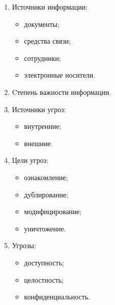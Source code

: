 \begin{minipage}{0.45\textwidth}
  \begin{enumerate}
    \item Источники информации:
      \begin{itemize}
    	\item документы;
    	\item средства связи;
    	\item сотрудники;
    	\item электронные носители.
      \end{itemize}
    \item Cтепень важности информации.
    \item Источники угроз:
      \begin{itemize}
    	\item внутренние;
    	\item внешние.
      \end{itemize}
    \item Цели угроз:
      \begin{itemize}
    	\item ознакомление;
    	\item дублирование;
    	\item модифицирование;
    	\item уничтожение.
      \end{itemize}
    \item Угрозы:
      \begin{itemize}
    	\item доступность;
    	\item целостность;
    	\item конфиденциальность.
      \end{itemize}
  \end{enumerate}
\end{minipage}
\hfill
